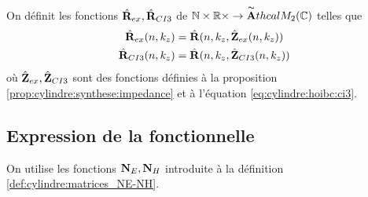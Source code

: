   \begin{defn}%
    \label{def:cylindre:minimisation:matrices_MR}
    On définit les fonctions \(\hat{\mathbf{R}}_{ex}, \hat{\mathbf{R}}_{CI3}\) de \(\mathbb N\times\mathbb R\times \rightarrow \overset{\thicksim}{\mathbf{A}}thcal{M}_2(\mathbb C)\) telles que
    \begin{align*}
      \hat{\mathbf{R}}_{ex}(n,k_z) &= \hat{\mathbf{R}}(n,k_z, \hat{\mathbf{Z}}_{ex}(n,k_z))
      \\
      \hat{\mathbf{R}}_{CI3}(n,k_z) &= \hat{\mathbf{R}}(n,k_z, \hat{\mathbf{Z}}_{CI3}(n,k_z))
    \end{align*}
    où \(\hat{\mathbf{Z}}_{ex},\hat{\mathbf{Z}}_{CI3}\) sont des fonctions définies à la proposition \ref{prop:cylindre:synthese:impedance} et à l'équation \eqref{eq:cylindre:hoibc:ci3}.
  \end{defn}

  \subsection{Expression de la fonctionnelle}

    On utilise les fonctions \(\mathbf{N}_E, \mathbf{N}_H\) introduite à la définition \ref{def:cylindre:matrices_NE-NH}.

